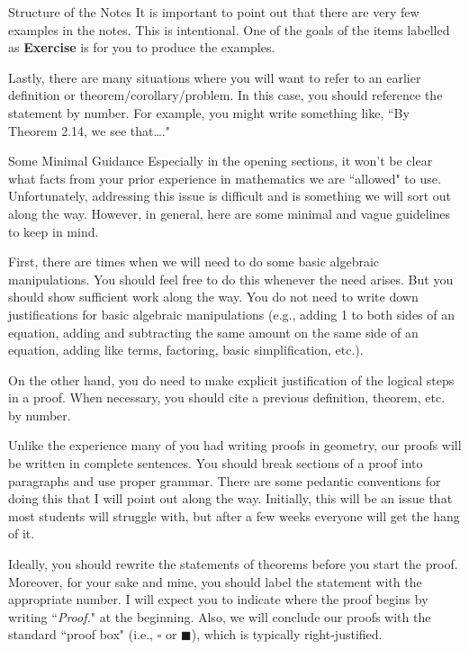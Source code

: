 \begin{section}{Structure of the Notes}
It is important to point out that there are very few examples in the notes.  This is intentional.  One of the goals of the items labelled as \textbf{Exercise} is for you to produce the examples.

Lastly, there are many situations where you will want to refer to an earlier definition or theorem/corollary/problem.  In this case, you should reference the statement by number.  For example, you might write something like, ``By Theorem 2.14, we see that\ldots."

\end{section}

\begin{section}{Some Minimal Guidance}
Especially in the opening sections, it won't be clear what facts from your prior experience in mathematics we are ``allowed" to use.  Unfortunately, addressing this issue is difficult and is something we will sort out along the way.  However, in general, here are some minimal and vague guidelines to keep in mind.  

First, there are times when we will need to do some basic algebraic manipulations.  You should feel free to do this whenever the need arises.  But you should show sufficient work along the way.  You do not need to write down justifications for basic algebraic manipulations (e.g., adding 1 to both sides of an equation, adding and subtracting the same amount on the same side of an equation, adding like terms, factoring, basic simplification, etc.).  

On the other hand, you do need to make explicit justification of the logical steps in a proof.  When necessary, you should cite a previous definition, theorem, etc. by number.

Unlike the experience many of you had writing proofs in geometry, our proofs will be written in complete sentences.  You should break sections of a proof into paragraphs and use proper grammar.  There are some pedantic conventions for doing this that I will point out along the way.  Initially, this will be an issue that most students will struggle with, but after a few weeks everyone will get the hang of it.

Ideally, you should rewrite the statements of theorems before you start the proof.  Moreover, for your sake and mine, you should label the statement with the appropriate number.  I will expect you to indicate where the proof begins by writing ``\emph{Proof.}" at the beginning.  Also, we will conclude our proofs with the standard ``proof box" (i.e., $\square$ or $\blacksquare$), which is typically right-justified.


\end{section}
